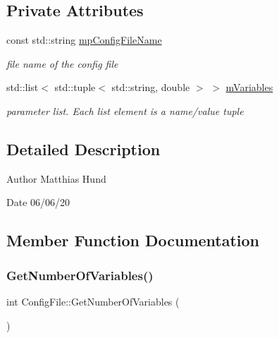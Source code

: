 \subsection*{Private Attributes}
\begin{DoxyCompactItemize}
\item 
\mbox{\label{classConfigFile_a22529d587b96238050d2bf399190cc76}} 
const std\+::string \hyperlink{classConfigFile_a22529d587b96238050d2bf399190cc76}{mp\+Config\+File\+Name}
\begin{DoxyCompactList}\small\item\em file name of the config file \end{DoxyCompactList}\item 
\mbox{\label{classConfigFile_add6ced4a6aba6f2a67e3be298787c074}} 
std\+::list$<$ std\+::tuple$<$ std\+::string, double $>$ $>$ \hyperlink{classConfigFile_add6ced4a6aba6f2a67e3be298787c074}{m\+Variables}
\begin{DoxyCompactList}\small\item\em parameter list. Each list element is a name/value tuple \end{DoxyCompactList}\end{DoxyCompactItemize}


\subsection{Detailed Description}
\begin{DoxyAuthor}{Author}
Matthias Hund 
\end{DoxyAuthor}
\begin{DoxyDate}{Date}
06/06/20 
\end{DoxyDate}


\subsection{Member Function Documentation}
\mbox{\label{classConfigFile_a6dedab9ccb1548b6a0910cee953c0b49}} 
\subsubsection{\texorpdfstring{Get\+Number\+Of\+Variables()}{GetNumberOfVariables()}}
{\footnotesize\ttfamily int Config\+File\+::\+Get\+Number\+Of\+Variables (\begin{DoxyParamCaption}{ }\end{DoxyParamCaption})}



